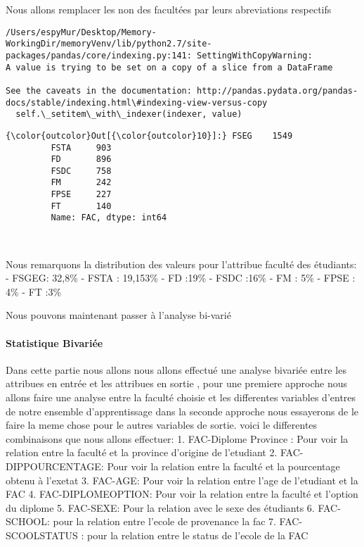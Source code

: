 \documentclass[11pt]{article}
\begin{document}
    Nous allons remplacer les non des facultées par leurs abreviations
respectifs

    \begin{Verbatim}[commandchars=\\\{\}]
/Users/espyMur/Desktop/Memory-WorkingDir/memoryVenv/lib/python2.7/site-packages/pandas/core/indexing.py:141: SettingWithCopyWarning: 
A value is trying to be set on a copy of a slice from a DataFrame

See the caveats in the documentation: http://pandas.pydata.org/pandas-docs/stable/indexing.html\#indexing-view-versus-copy
  self.\_setitem\_with\_indexer(indexer, value)

    \end{Verbatim}

            \begin{Verbatim}[commandchars=\\\{\}]
{\color{outcolor}Out[{\color{outcolor}10}]:} FSEG    1549
         FSTA     903
         FD       896
         FSDC     758
         FM       242
         FPSE     227
         FT       140
         Name: FAC, dtype: int64
\end{Verbatim}
        
    \begin{center}
    \end{center}
    { \hspace*{\fill} \\}
    
     Nous remarquons la distribution des valeurs pour
l'attribue faculté des étudiants: - FSGEG: 32,8\% - FSTA : 19,153\% - FD
:19\% - FSDC :16\% - FM : 5\% - FPSE : 4\% - FT :3\%

    Nous pouvons maintenant passer à l'analyse bi-varié

    \paragraph{Statistique Bivariée}\label{statistique-bivariuxe9e}

    Dans cette partie nous allons nous allons effectué une analyse bivariée
entre les attribues en entrée et les attribues en sortie , pour une
premiere approche nous allons faire une analyse entre la faculté choisie
et les differentes variables d'entres de notre ensemble d'apprentissage
dans la seconde approche nous essayerons de le faire la meme chose pour
le autres variables de sortie. voici le differentes combinaisons que
nous allons effectuer: 1. FAC-Diplome Province : Pour voir la relation
entre la faculté et la province d'origine de l'etudiant 2.
FAC-DIPPOURCENTAGE: Pour voir la relation entre la faculté et la
pourcentage obtenu à l'exetat 3. FAC-AGE: Pour voir la relation entre
l'age de l'etudiant et la FAC 4. FAC-DIPLOMEOPTION: Pour voir la
relation entre la faculté et l'option du diplome 5. FAC-SEXE: Pour la
relation avec le sexe des étudiants 6. FAC-SCHOOL: pour la relation
entre l'ecole de provenance la fac 7. FAC-SCOOLSTATUS : pour la relation
entre le status de l'ecole de la FAC
\end{document}
